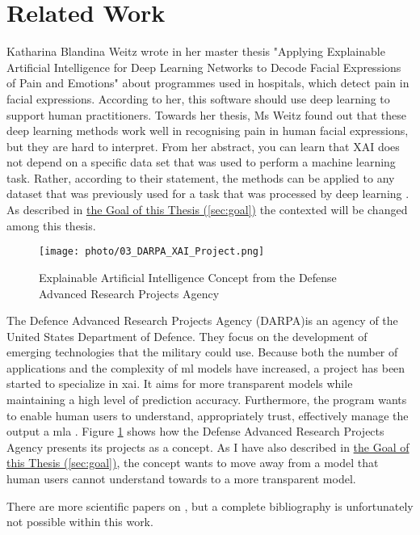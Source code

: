 \section{Related Work}

Katharina Blandina Weitz wrote in her master thesis "Applying Explainable Artificial Intelligence for Deep Learning Networks to Decode Facial Expressions of Pain and Emotions" about programmes used in hospitals, which detect pain in facial expressions. According to her, this software should use deep learning to support human practitioners. Towards her thesis, Ms Weitz found out that these deep learning methods work well in recognising pain in human facial expressions, but they are hard to interpret. From her abstract, you can learn that XAI does not depend on a specific data set that was used to perform a machine learning task. Rather, according to their statement, the methods can be applied to any dataset that was previously used for a task that was processed by deep learning \cite{Weitz2018}. As described in \hyperref[sec:goal]{the Goal of this Thesis (\ref{sec:goal})} the contexted will be changed among this thesis.\\

\begin{figure}[!htp]
	\centering
	\texttt{[image: photo/03\_DARPA\_XAI\_Project.png]}
	\caption{Explainable Artificial Intelligence Concept from the Defense Advanced Research Projects Agency \cite{Robinson2017}}
	\label{fig:03_DARPA_XAI_Project}
\end{figure}

The Defence Advanced Research Projects Agency (DARPA)is an agency of the United States Department of Defence. They focus on the development of emerging technologies that the military could use. Because both the number of applications and the complexity of \gls{ml} models have increased, a project has been started to specialize in \gls{xai}. It aims for more transparent models while maintaining a high level of prediction accuracy. Furthermore, the program wants to enable human users to understand, appropriately trust, effectively manage the output a \gls{mla} \cite{Robinson2017}. Figure \ref{fig:03_DARPA_XAI_Project} shows how the Defense Advanced Research Projects Agency presents its projects as a concept. As I have also described in \hyperref[sec:goal]{the Goal of this Thesis (\ref{sec:goal})}, the concept wants to move away from a model that human users cannot understand towards to a more transparent model. 

There are more scientific papers on , but a complete bibliography is unfortunately not possible within this work.\\
